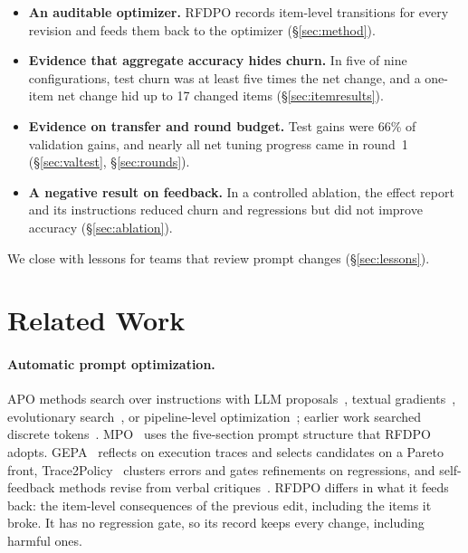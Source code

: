 \documentclass[11pt]{article}
\begin{document}
\begin{itemize}
\setlength{\itemsep}{1pt}
\setlength{\parskip}{0pt}
\setlength{\topsep}{1pt}

\item \textbf{An auditable optimizer.} RFDPO records item-level transitions for every revision and feeds them back to the optimizer (\S\ref{sec:method}).

\item \textbf{Evidence that aggregate accuracy hides churn.} In five of nine configurations, test churn was at least five times the net change, and a one-item net change hid up to 17 changed items (\S\ref{sec:itemresults}).

\item \textbf{Evidence on transfer and round budget.} Test gains were 66\% of validation gains, and nearly all net tuning progress came in round~1 (\S\ref{sec:valtest}, \S\ref{sec:rounds}).

\item \textbf{A negative result on feedback.} In a controlled ablation, the effect report and its instructions reduced churn and regressions but did not improve accuracy (\S\ref{sec:ablation}).

\end{itemize}

\noindent We close with lessons for teams that review prompt changes (\S\ref{sec:lessons}).

\section{Related Work}
\label{sec:related}

\paragraph{Automatic prompt optimization.}
APO methods search over instructions with LLM proposals~\citep{zhou2023ape,yang2024opro}, textual gradients~\citep{pryzant2023protegi,yuksekgonul2025textgrad}, evolutionary search~\citep{guo2024evoprompt,fernando2024promptbreeder}, or pipeline-level optimization~\citep{opsahlong2024miprov2,schnabel2024sammo,khattab2024dspy}; earlier work searched discrete tokens~\citep{shin2020autoprompt}. MPO~\citep{sharma2026mpo} uses the five-section prompt structure that RFDPO adopts. GEPA~\citep{agrawal2026gepa} reflects on execution traces and selects candidates on a Pareto front, Trace2Policy~\citep{zha2026trace2policy} clusters errors and gates refinements on regressions, and self-feedback methods revise from verbal critiques~\citep{madaan2023selfrefine,shinn2023reflexion}. RFDPO differs in what it feeds back: the item-level consequences of the previous edit, including the items it broke. It has no regression gate, so its record keeps every change, including harmful ones.
\end{document}
